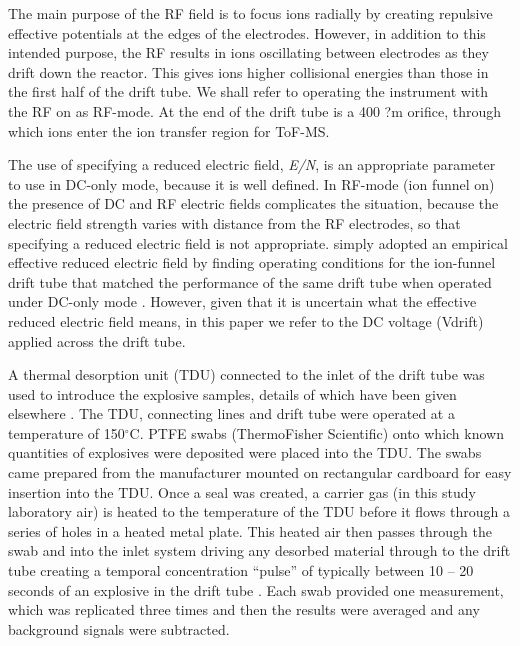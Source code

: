 The main purpose of the RF field is to focus ions radially by creating repulsive effective potentials at the edges of the electrodes. However, in addition to this intended purpose, the RF results in ions oscillating between electrodes as they drift down the reactor. This gives ions higher collisional energies than those in the first half of the drift tube. We shall refer to operating the instrument with the RF on as RF-mode. At the end of the drift tube is a 400 ?m orifice, through which ions enter the ion transfer region for ToF-MS.


The use of specifying a reduced electric field, \textit{E/N}, is an appropriate parameter to use in DC-only mode, because it is well defined. In RF-mode (ion funnel on) the presence of DC and RF electric fields complicates the situation, because the electric field strength varies with distance from the RF electrodes, so that specifying a reduced electric field is not appropriate. \citeauthor{barber2012increased}  simply adopted an empirical effective reduced electric field by finding operating conditions for the ion-funnel drift tube that matched the performance of the same drift tube when operated under DC-only mode \cite{barber2012increased}. However, given that it is uncertain what the effective reduced electric field means, in this paper we refer to the DC voltage (Vdrift) applied across the drift tube.

A thermal desorption unit (TDU) connected to the inlet of the drift tube was used to introduce the explosive samples, details of which have been given elsewhere \cite{RN445}. The TDU, connecting lines and drift tube were operated at a temperature of 150$^{\circ}$C. PTFE swabs (ThermoFisher Scientific) onto which known quantities of explosives were deposited were placed into the TDU. The swabs came prepared from the manufacturer mounted on rectangular cardboard for easy insertion into the TDU. Once a seal was created, a carrier gas (in this study laboratory air) is heated to the temperature of the TDU before it flows through a series of holes in a heated metal plate. This heated air then passes through the swab and into the inlet system driving any desorbed material through to the drift tube creating a temporal concentration “pulse” of typically between 10 – 20 seconds of an explosive in the drift tube \cite{RN445}. Each swab provided one measurement, which was replicated three times and then the results were averaged and any background signals were subtracted. 

